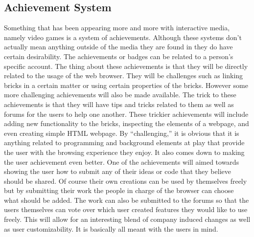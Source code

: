 \documentclass[11pt]{article}
\begin{document}
\subsection{Achievement System}
Something that has been appearing more and more with interactive media, namely video games is a system of achievements. Although these systems don’t actually mean anything outside of the media they are found in they do have certain desirability. The achievements or badges can be related to a person’s specific account. The thing about these achievements is that they will be directly related to the usage of the web browser. They will be challenges such as linking bricks in a certain matter or using certain properties of the bricks. However some more challenging achievements will also be made available. The trick to these achievements is that they will have tips and tricks related to them as well as forums for the users to help one another. These trickier achievements will include adding new functionality to the bricks, inspecting the elements of a webpage, and even creating simple HTML webpage. By “challenging,” it is obvious that it is anything related to programming and background elements at play that provide the user with the browsing experience they enjoy. It also comes down to making the user achievement even better. One of the achievements will aimed towards showing the user how to submit any of their ideas or code that they believe should be shared. Of course their own creations can be used by themselves freely but by submitting their work the people in charge of the browser can choose what should be added. The work can also be submitted to the forums so that the users themselves can vote over which user created features they would like to use freely. This will allow for an interesting blend of company induced changes as well as user customizability. It is basically all meant with the users in mind.
\end{document}
